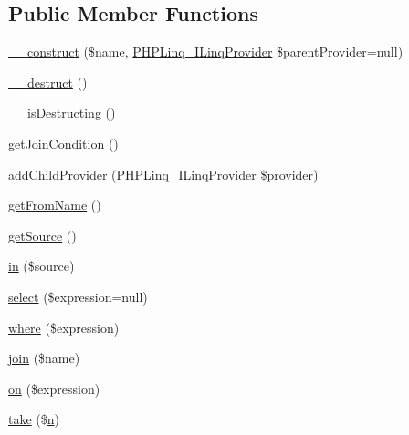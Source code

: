\subsection*{\-Public \-Member \-Functions}
\begin{DoxyCompactItemize}
\item 
\hyperlink{interface_p_h_p_linq___i_linq_provider_a928a5f42150b4e56d17aef568cfc5422}{\-\_\-\-\_\-construct} (\$name, \hyperlink{interface_p_h_p_linq___i_linq_provider}{\-P\-H\-P\-Linq\-\_\-\-I\-Linq\-Provider} \$parent\-Provider=null)
\item 
\hyperlink{interface_p_h_p_linq___i_linq_provider_a421831a265621325e1fdd19aace0c758}{\-\_\-\-\_\-destruct} ()
\item 
\hyperlink{interface_p_h_p_linq___i_linq_provider_a506479f6f7a079e71fbdeda02a1a6ab8}{\-\_\-\-\_\-is\-Destructing} ()
\item 
\hyperlink{interface_p_h_p_linq___i_linq_provider_ad0ca423b939b19d85496cf514d1b5bb0}{get\-Join\-Condition} ()
\item 
\hyperlink{interface_p_h_p_linq___i_linq_provider_a798e73787fcde65c17ad338b08f54fe7}{add\-Child\-Provider} (\hyperlink{interface_p_h_p_linq___i_linq_provider}{\-P\-H\-P\-Linq\-\_\-\-I\-Linq\-Provider} \$provider)
\item 
\hyperlink{interface_p_h_p_linq___i_linq_provider_a3c49ca214406f4a6b62da5e775d6fb7a}{get\-From\-Name} ()
\item 
\hyperlink{interface_p_h_p_linq___i_linq_provider_a42fdd8313c99d9c5f80219c1e192b93a}{get\-Source} ()
\item 
\hyperlink{interface_p_h_p_linq___i_linq_provider_a91ece07609442e0e388f1115c21f2259}{in} (\$source)
\item 
\hyperlink{interface_p_h_p_linq___i_linq_provider_ad65fd69a356c5d75610ef1c5c8f9e3b1}{select} (\$expression=null)
\item 
\hyperlink{interface_p_h_p_linq___i_linq_provider_a59e1acf3496c614274a406aad5f59e99}{where} (\$expression)
\item 
\hyperlink{interface_p_h_p_linq___i_linq_provider_a1ac24d63648701a6876a2eb91f03900d}{join} (\$name)
\item 
\hyperlink{interface_p_h_p_linq___i_linq_provider_a000230305e785b77bb55704d625d103b}{on} (\$expression)
\item 
\hyperlink{interface_p_h_p_linq___i_linq_provider_a3962e38f48bc7bfd63ff01815e216ded}{take} (\$\hyperlink{add__cvs_8php_ab1b2829a7425bcec97d0ab4e6b3c77f2}{n})
\item 

\end{DoxyCompactItemize}
